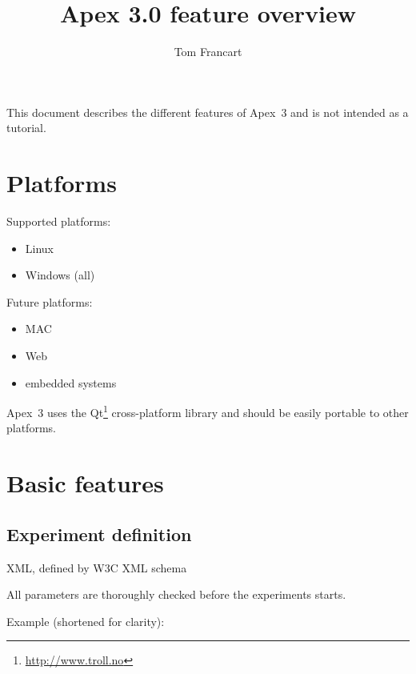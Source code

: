 \documentclass[a4paper,12pt]{article}
\title{Apex 3.0 feature overview}
\author{Tom Francart}
\begin{document}
\maketitle

\tableofcontents

\vspace{2cm}


This document describes the different features of Apex~3 and is not intended as a tutorial.

\section{Platforms}

Supported platforms:

\begin{itemize}
\item Linux
\item Windows (all)
\end{itemize}

Future platforms:
\begin{itemize}
\item MAC
\item Web
\item embedded systems
\end{itemize}

Apex~3 uses the Qt\footnote{\url{http://www.troll.no}} cross-platform library and should be easily portable to other platforms. 


\section{Basic features}

\subsection{Experiment definition}

XML, defined by W3C XML schema

All parameters are thoroughly checked before the experiments starts.

Example (shortened for clarity):
\end{document}
